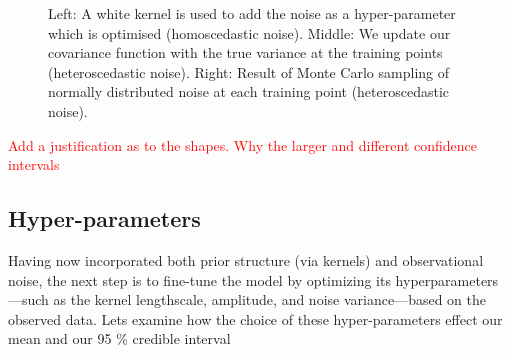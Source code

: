 \documentclass{article}
\begin{document}
\begin{figure}[H]
\begin{subfigure}[b]{0.3\textwidth}
    \end{subfigure}
    \caption{
    Left: A white kernel is used to add the noise as a hyper-parameter which is optimised (homoscedastic noise). 
    Middle: We update our covariance function with the true variance at the training points (heteroscedastic noise). 
    Right: Result of Monte Carlo sampling of normally distributed noise at each training point (heteroscedastic noise).
    }
\end{figure}

\textcolor{red}{Add a justification as to the shapes. Why the larger and different confidence intervals}


\subsection{Hyper-parameters}

\bigskip

\noindent
Having now incorporated both prior structure (via kernels) and observational noise, the next step is to fine-tune the model by optimizing its hyperparameters—such as the kernel lengthscale, amplitude, and noise variance—based on the observed data.
Lets examine how the choice of these hyper-parameters effect our mean and our 95 \% credible interval
\end{document}
